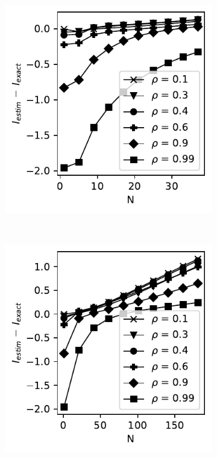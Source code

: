 \documentclass[../Thesis.tex]{subfiles}
\begin{document}
\begin{figure}[H]
    \centering
    \begin{subfigure}[t]{0.4\textwidth}
        \centering
        \includegraphics[width=\linewidth]{figures/ND examples/MI calc/gaussian example original zoom - M-spline - error.pdf}
        \caption{}
    \end{subfigure}%
    ~
    \begin{subfigure}[t]{0.4\textwidth}
        \centering
        \includegraphics[width=\linewidth]{figures/ND examples/MI calc/gaussian example original all - M-spline - error.pdf}
        \caption{}
    \end{subfigure}
    \caption{}
    \label{fig:M-spline approach results MI - error}
\end{figure}
\end{document}
